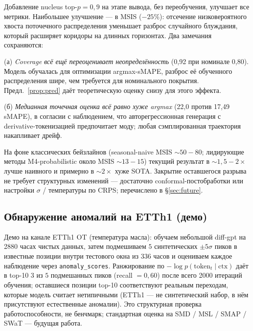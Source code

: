 \documentclass[11pt]{article}
\theoremstyle{remark}
\begin{document}
Добавление nucleus top-$p = 0{,}9$ на этапе вывода, без переобучения,
улучшает все метрики. Наибольшее улучшение --- в MSIS ($-25\%$):
отсечение низковероятного хвоста поточечного распределения уменьшает
разброс случайного блуждания, который расширяет коридоры на длинных
горизонтах. Два замечания сохраняются:

(а) \emph{Coverage всё ещё переоценивает неопределённость} (0{,}92
при номинале 0{,}80). Модель обучалась для оптимизации argmax-sMAPE,
разброс её обученного распределения шире, чем требуется для
номинального покрытия. Предл.~\ref{prop:pred} даёт теоретическую
оценку снизу для этого эффекта.

(б) \emph{Медианная точечная оценка всё равно хуже argmax} (22{,}0
против 17{,}49 sMAPE), в согласии с наблюдением, что авторегрессионная
генерация с derivative-токенизацией предпочитает моду; любая
сэмплированная траектория накапливает дрейф.

На фоне классических бейзлайнов (seasonal-naive MSIS $\sim 50{-}80$;
лидирующие методы M4-probabilistic около MSIS $\sim 13{-}15$)
текущий результат в $\sim 1{,}5{-}2\times$ лучше наивного и примерно
в $\sim 2\times$ хуже SOTA. Закрытие оставшегося разрыва не требует
структурных изменений --- достаточно conformal-постобработки или
настройки $\sigma$ / температуры по CRPS; перечислено в
\S\ref{sec:future}.

\subsection{Обнаружение аномалий на ETTh1 (демо)}
\label{sec:anom-ett}

Демо на канале ETTh1 OT (температура масла): обучаем небольшой
diff-gpt на 2880 часах чистых данных, затем подмешиваем $5$ синтетических
$\pm 5\sigma$ пиков в известные позиции внутри тестового окна из
336 часов и оцениваем каждое наблюдение через
\texttt{anomaly\_scores}. Ранжирование по $-\log p(\text{token}_t
\mid \mathrm{ctx})$ даёт в top-10 $3$ из $5$ подмешанных пиков
(recall $= 0{,}60$) после всего 2000 итераций обучения; оставшиеся
позиции top-10 соответствуют реальным переходам, которые модель
считает нетипичными (ETTh1 --- не синтетический набор, в нём
присутствуют естественные аномалии). Это структурная проверка
работоспособности, не бенчмарк; стандартная оценка на
SMD / MSL / SMAP / SWaT --- будущая работа.
\end{document}
